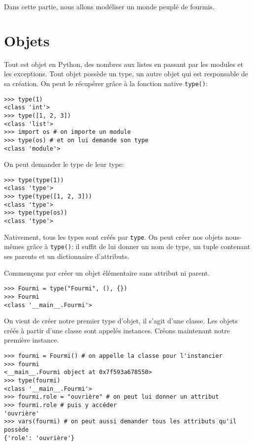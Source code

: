 Dans cette partie, nous allons modéliser un monde peuplé de fourmis.

\section{Objets}

Tout est objet en Python, des nombres aux listes en passant par les modules et les exceptions. Tout objet possède un type, un autre objet qui est responsable de sa création. On peut le récupérer grâce à la fonction native \texttt{type()}:

\begin{verbatim}
>>> type(1)
<class 'int'>
>>> type([1, 2, 3])
<class 'list'>
>>> import os # on importe un module
>>> type(os) # et on lui demande son type
<class 'module'>
\end{verbatim}

On peut demander le type de leur type:

\begin{verbatim}
>>> type(type(1))
<class 'type'>
>>> type(type([1, 2, 3]))
<class 'type'>
>>> type(type(os))
<class 'type'>
\end{verbatim}

Nativement, tous les types sont créés par \texttt{type}. On peut créer nos objets nous-mêmes grâce à \texttt{type()}: il suffit de lui donner un nom de type, un tuple contenant ses parents et un dictionnaire d'attributs.\medskip

Commençons par créer un objet élémentaire sans attribut ni parent.

\begin{verbatim}
>>> Fourmi = type("Fourmi", (), {})
>>> Fourmi
<class '__main__.Fourmi'>
\end{verbatim}

On vient de créer notre premier type d'objet, il s'agit d'une classe. Les objets créés à partir d'une classe sont appelés instances. Créons maintenant notre première instance.

\begin{verbatim}
>>> fourmi = Fourmi() # on appelle la classe pour l'instancier
>>> fourmi
<__main__.Fourmi object at 0x7f593a678550>
>>> type(fourmi)
<class '__main__.Fourmi'>
>>> fourmi.role = "ouvrière" # on peut lui donner un attribut
>>> fourmi.role # puis y accéder
'ouvrière'
>>> vars(fourmi) # on peut aussi demander tous les attributs qu'il possède
{'role': 'ouvrière'}
\end{verbatim}

